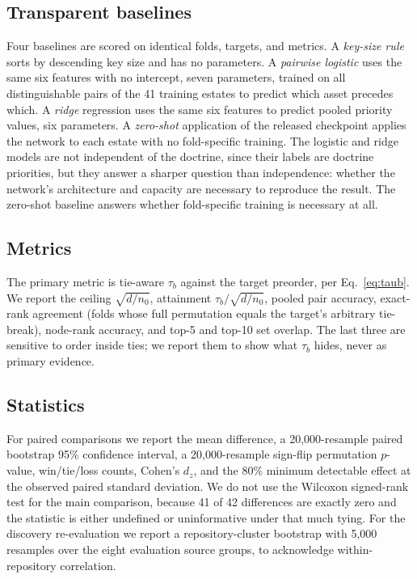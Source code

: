 \documentclass[journal,10pt]{IEEEtran}
\newcommand{\tb}{\tau_b}
\newcommand{\distinct}{d}
\newcommand{\nzero}{n_0}
\begin{document}
\subsection{Transparent baselines}

Four baselines are scored on identical folds, targets, and metrics. A \emph{key-size rule} sorts by
descending key size and has no parameters. A \emph{pairwise logistic} uses the same six features
with no intercept, seven parameters, trained on all distinguishable pairs of the 41 training
estates to predict which asset precedes which. A \emph{ridge} regression uses the same six features
to predict pooled priority values, six parameters. A \emph{zero-shot} application of the released
checkpoint applies the network to each estate with no fold-specific training. The logistic and
ridge models are not independent of the doctrine, since their labels are doctrine priorities, but
they answer a sharper question than independence: whether the network's architecture and capacity
are necessary to reproduce the result. The zero-shot baseline answers whether fold-specific
training is necessary at all.

\subsection{Metrics}

The primary metric is tie-aware $\tb$ against the target preorder, per Eq.~\eqref{eq:taub}. We
report the ceiling $\sqrt{\distinct/\nzero}$, attainment $\tb/\sqrt{\distinct/\nzero}$, pooled pair
accuracy, exact-rank agreement (folds whose full permutation equals the target's arbitrary
tie-break), node-rank accuracy, and top-5 and top-10 set overlap. The last three are sensitive to
order inside ties; we report them to show what $\tb$ hides, never as primary evidence.

\subsection{Statistics}

For paired comparisons we report the mean difference, a 20{,}000-resample paired bootstrap 95\%
confidence interval, a 20{,}000-resample sign-flip permutation $p$-value, win/tie/loss counts,
Cohen's $d_z$, and the 80\% minimum detectable effect at the observed paired standard deviation. We
do not use the Wilcoxon signed-rank test for the main comparison, because 41 of 42 differences are
exactly zero and the statistic is either undefined or uninformative under that much tying. For the
discovery re-evaluation we report a repository-cluster bootstrap with 5{,}000 resamples over the
eight evaluation source groups, to acknowledge within-repository correlation.
\end{document}
